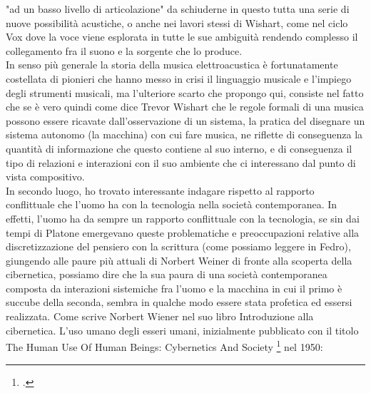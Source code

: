 "ad un basso livello di articolazione" da schiuderne in questo tutta una serie di nuove possibilità
acustiche, o anche nei lavori stessi di Wishart, come nel ciclo Vox 
dove la voce viene esplorata in tutte le sue ambiguità rendendo
complesso il collegamento fra il suono e la sorgente che lo produce. \\
In senso più generale la storia della musica elettroacustica è fortunatamente costellata 
di pionieri che hanno messo in crisi il linguaggio musicale e l'impiego degli strumenti musicali,
ma l'ulteriore scarto che propongo qui, consiste nel fatto che se è vero quindi come 
dice Trevor Wishart che le regole formali di una musica possono
essere ricavate dall'osservazione di un sistema, 
la pratica del disegnare un sistema autonomo (la macchina) con cui fare musica,
ne riflette di conseguenza la quantità di informazione che questo contiene al suo interno,
e di conseguenza il tipo di relazioni e interazioni con il suo ambiente che 
ci interessano dal punto di vista compositivo.\\
In secondo luogo, ho trovato interessante indagare rispetto al rapporto conflittuale che l'uomo ha con la tecnologia
nella società contemporanea. 
In effetti, l'uomo ha da sempre un rapporto conflittuale con la tecnologia,
se sin dai tempi di Platone emergevano queste problematiche e preoccupazioni
relative alla discretizzazione del pensiero con la scrittura
(come possiamo leggere in Fedro), 
giungendo alle paure più attuali di Norbert Weiner di fronte
alla scoperta della cibernetica, possiamo dire che la sua paura di una società contemporanea 
composta da interazioni sistemiche fra l'uomo e la macchina
in cui il primo è succube della seconda, sembra in qualche modo essere stata profetica ed essersi realizzata.
Come scrive Norbert Wiener nel suo libro Introduzione alla cibernetica. L'uso umano degli esseri umani,
inizialmente pubblicato con il titolo The Human Use Of Human Beings: Cybernetics And Society \footcite{wiener_introduzione_nodate}
nel 1950:

